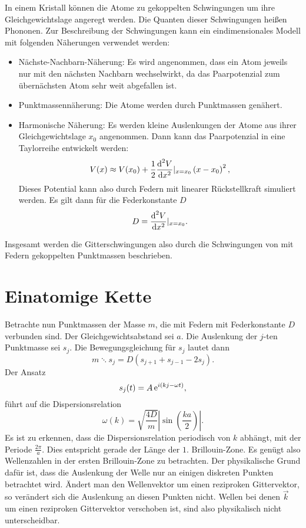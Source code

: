 In einem Kristall können die Atome zu gekoppelten Schwingungen um ihre Gleichgewichtslage angeregt werden. Die Quanten dieser Schwingungen heißen Phononen. Zur Beschreibung der Schwingungen kann ein eindimensionales Modell mit folgenden Näherungen verwendet werden:
\begin{itemize}
  \item Nächste-Nachbarn-Näherung: Es wird angenommen, dass ein Atom jeweils nur mit den nächsten Nachbarn wechselwirkt, da das Paarpotenzial zum übernächsten Atom sehr weit abgefallen ist.
  \item Punktmassennäherung: Die Atome werden durch Punktmassen genähert.
  \item Harmonische Näherung: Es werden kleine Auslenkungen der Atome aus ihrer Gleichgewichtslage $x_{0}$ angenommen. Dann kann das Paarpotenzial in eine Taylorreihe entwickelt werden:
      \begin{equation}
       V(x) \approx V(x_{0}) +\frac{1}{2} \frac{\text{d}^{2}V}{\text{d} x^{2}}\rvert_{x=x_{0}} \left(x-x_{0}\right)^{2}, 
      \end{equation}
      Dieses Potential kann also durch Federn mit linearer Rückstellkraft simuliert werden. Es gilt dann für die Federkonstante $D$
      \begin{equation}
       D = \frac{\text{d}^{2}V}{\text{d} x^{2}}|_{x=x_{0}}.
      \end{equation}
\end{itemize}
Insgesamt werden die Gitterschwingungen also durch die Schwingungen von mit Federn gekoppelten Punktmassen beschrieben.

\section{Einatomige Kette}

Betrachte nun Punktmassen der Masse $m$, die mit Federn mit Federkonstante $D$ verbunden sind. Der Gleichgewichtsabstand sei $a$. Die Auslenkung der $j$-ten Punktmasse sei $s_{j}$. Die Bewegungsgleichung für $s_{j}$ lautet dann
\begin{equation}
  m\ddots{s}_{j} = D\left( s_{j+1} + s_{j-1} -2s_{j} \right).
\end{equation}
Der Ansatz
\begin{equation}
 s_{j}(t) = A \operatorname{e}^{i(kj-\omega t)},
\end{equation}
führt auf die Dispersionsrelation
\begin{equation}
 \omega(k) = \sqrt{\frac{4D}{m}} \left|\sin\left(\frac{ka}{2}\right)\right|.
\end{equation}
Es ist zu erkennen, dass die Dispersionsrelation periodisch von $k$ abhängt, mit der Periode $\frac{2\pi}{a}$. Dies entspricht gerade der Länge der $1.$ Brillouin-Zone. Es genügt also Wellenzahlen in der ersten Brillouin-Zone zu betrachten. Der physikalische Grund dafür ist, dass die Auslenkung der Welle nur an einigen diskreten Punkten betrachtet wird. Ändert man den Wellenvektor um einen reziproken Gittervektor, so verändert sich die Auslenkung an diesen Punkten nicht. Wellen bei denen $\vec{k}$ um einen reziproken Gittervektor verschoben ist, sind also physikalisch nicht unterscheidbar.
